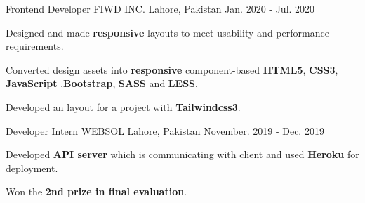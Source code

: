 \begin{cventries}
  \cventry
    {Frontend Developer} %
    {FIWD INC.} %
    {Lahore, Pakistan} %
    {Jan. 2020 - Jul. 2020} %
    {
      \begin{cvitems} %
        \item {Designed and made \textbf{responsive} layouts to meet usability and performance requirements.}
        \item {Converted design assets into \textbf{responsive} component-based \textbf{HTML5}, \textbf{CSS3}, \textbf{JavaScript} ,\textbf{Bootstrap}, \textbf{SASS} and \textbf{LESS}.}
        \item {Developed an layout for a project with \textbf{Tailwindcss3}.}
        \end{cvitems}
    }

  \cventry
    {Developer Intern} %
    {WEBSOL} %
    {Lahore, Pakistan} %
    {November. 2019 - Dec. 2019} %
    {
      \begin{cvitems} %
        \item {Developed \textbf{API server} which is communicating with client and used \textbf{Heroku} for deployment.}
        \item {Won the \textbf{2nd prize in final evaluation}.}
      \end{cvitems}
    }

\end{cventries}
